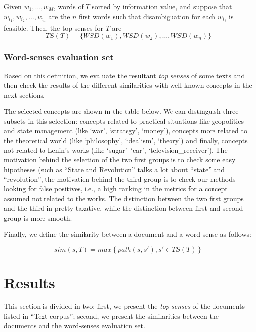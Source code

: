 \documentclass{pnastwo}
\begin{document}
\begin{article}
Given $w_1, \ldots, w_M$, words of $T$ sorted by information value, and suppose that $w_{i_1}, w_{i_2}, \ldots, w_{i_n}$ are the $n$ first words  such that disambiguation for each $w_{i_j}$ is feasible. Then, the top senses for $T$ are
\begin{equation}
  TS(T) = \{ WSD(w_1), WSD(w_2), \ldots, WSD(w_n) \}
\end{equation}

\subsubsection{Word-senses evaluation set}


Based on this definition, we evaluate the resultant \textit{top senses} of some texts and then check the results of the different similarities with well known concepts in the next sections.

The selected concepts are shown in the table below. We can distinguish three subsets in this selection: concepts related to practical situations like geopolitics and state management (like `war', `strategy', `money'), concepts more related to the theoretical world (like  `philosophy', `idealism', `theory') and finally, concepts not related to Lenin's works (like `sugar', `car', `television\_receiver'). The motivation behind the selection of the two first groups is to check some easy hipotheses (such as ``State and Revolution'' talks a lot about ``state'' and ``revolution'', the motivation behind the third group is to check our methods looking for false positives, i.e., a high ranking in the metrics for a concept assumed not related to the works. The distinction between the two first groups and the third in pretty taxative, while the distinction between first and second group is more smooth.

Finally, we define the similarity between a document and a word-sense as follows:

\begin{equation}
  sim(s, T) = max \left\{ path(s,s'), s' \in TS(T) \right\}
\end{equation}




\section{Results}
This section is divided in two: first, we present the \textit{top senses} of the documents listed in ``Text corpus''; second, we present the similarities between the documents and the word-senses evaluation set.


\end{article}
\end{document}
